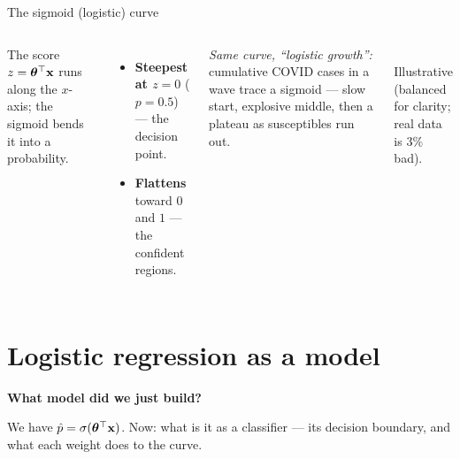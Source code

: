 \documentclass[aspectratio=169]{beamer}
\begin{document}
\begin{frame}{The sigmoid (logistic) curve}
  \begin{columns}[T]
    \small
    The score $z = \bm{\theta}^\top \mathbf{x}$ runs along the $x$-axis; the sigmoid bends it into a probability.
    \begin{itemize}\small
      \item \textbf{Steepest at $z=0$} ($p=0.5$) --- the decision point.
      \item \textbf{Flattens} toward $0$ and $1$ --- the confident regions.
    \end{itemize}
    \vskip 6pt
    \footnotesize \emph{Same curve, ``logistic growth'':} cumulative COVID cases in a wave
    trace a sigmoid --- slow start, explosive middle, then a plateau as susceptibles run out.
    \begin{center}
      \\[-2pt]
      \scriptsize Illustrative (balanced for clarity; real data is $3\%$ bad).
    \end{center}
  \end{columns}
\end{frame}

\section{Logistic regression as a model}

\begin{frame}[plain]
  \vfill
  \begin{center}
    {\Large\color{popblue}\textbf{What model did we just build?}}\\[0.9em]
    \begin{minipage}{0.82\textwidth}\centering\small
      We have $\hat p = \sigma(\bm{\theta}^\top \mathbf{x})$. Now: what is it as a classifier --- its decision
      boundary, and what each weight does to the curve.
    \end{minipage}
  \end{center}
  \vfill
\end{frame}
\end{document}
